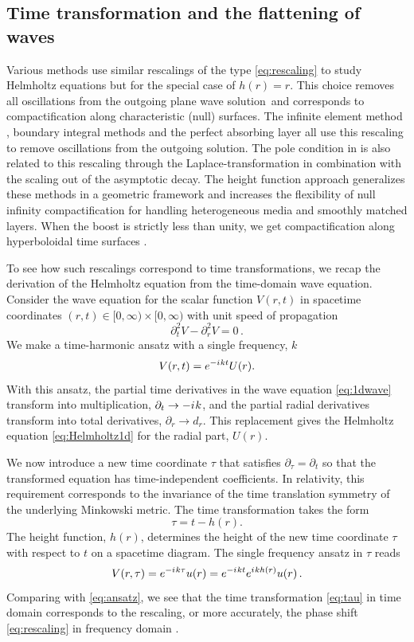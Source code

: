 \documentclass[draft,onefignum,onetabnum]{siamart190516}
\newcommand{\be}{\begin{equation}}
\newcommand{\ee}{\end{equation}}
\newcommand{\iu}{{i\mkern1mu}}
\begin{document}
\subsection{Time transformation and the flattening of waves} 
Various methods use similar rescalings of the type \eqref{eq:rescaling} to study Helmholtz equations but for the special case of $h(r)=r$. This choice removes all oscillations from the outgoing plane wave solution and corresponds to compactification along characteristic (null) surfaces. The infinite element method \cite{demkowicz2006few}, boundary integral methods \cite{chandler2012numerical} and the perfect absorbing layer \cite{wang2017perfect, yang2021truly} all use this rescaling to remove oscillations from the outgoing solution. The pole condition in \cite{schmidt2008pole} is also related to this rescaling through the Laplace-transformation in combination with the scaling out of the asymptotic decay. The height function approach generalizes these methods in a geometric framework and increases the flexibility of null infinity compactification for handling heterogeneous media and smoothly matched layers. When the boost is strictly less than unity, we get compactification along hyperboloidal time surfaces \cite{Zenginoglu08}. 

To see how such rescalings correspond to time transformations, we recap the derivation of the Helmholtz equation from the time-domain wave equation. Consider the wave equation for the scalar function $V(r,t)$ in spacetime coordinates $(r,t)\in[0,\infty)\times[0,\infty)$ with unit speed of propagation
\be\label{eq:1dwave} \partial_t^2 V - \partial_r^2 V = 0\,. \ee
We make a time-harmonic ansatz with a single frequency, $k$
\be\label{eq:ansatz} 
V(r,t)= e^{-\iu k t} U(r).
\ee 
With this ansatz, the partial time derivatives in the wave equation \eqref{eq:1dwave} transform into multiplication, $\partial_t\to-\iu k$, and the partial radial derivatives transform into total derivatives, $\partial_r\to d_r$. This replacement gives the Helmholtz equation \eqref{eq:Helmholtz1d} for the radial part, $U(r)$.

We now introduce a new time coordinate $\tau$ that satisfies $\partial_\tau=\partial_t$ so that the transformed equation has time-independent coefficients. In relativity, this requirement corresponds to the invariance of the time translation symmetry of the underlying Minkowski metric. The time transformation takes the form
\be\label{eq:tau} \tau = t - h(r).\ee
The height function, $h(r)$, determines the height of the new time coordinate $\tau$ with respect to $t$ on a spacetime diagram. The single frequency ansatz in $\tau$ reads
\[ V(r, \tau) = e^{-\iu k \tau} u(r) = e^{-\iu k t} e^{\iu k h(r)} u(r)\,.\]
Comparing with \eqref{eq:ansatz}, we see that the time transformation \eqref{eq:tau} in time domain corresponds to the rescaling, or more accurately, the phase shift \eqref{eq:rescaling} in frequency domain \cite{ZengFramework, ansorg2016spectral, macedo2018hyperboloidal, marchner2021stable}.
\end{document}

